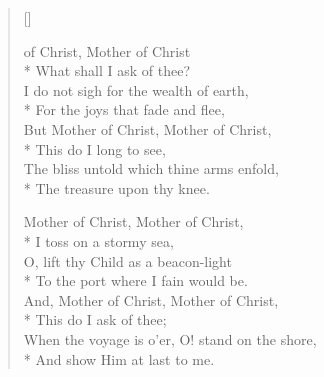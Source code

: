 \newHymn


\begin{verse}[\versewidth]

\begin{altverse}
 of Christ, Mother of Christ\\*
What shall I ask of thee?\\
I do not sigh for the wealth of earth,\\*
For the joys that fade and flee,\\
But Mother of Christ, Mother of Christ,\\*
This do I long to see,\\
The bliss untold which thine arms enfold, \\*
The treasure upon thy knee.
\end{altverse}

\begin{altverse}
 Mother of Christ, Mother of Christ,\\*
I toss on a stormy sea,\\
O, lift thy Child as a beacon-light\\*
To the port where I fain would be.\\
And, Mother of Christ, Mother of Christ,\\*
This do I ask of thee;\\
When the voyage is o'er, O! stand on the shore,\\*
And show Him at last to me.
\end{altverse}

\end{verse}

